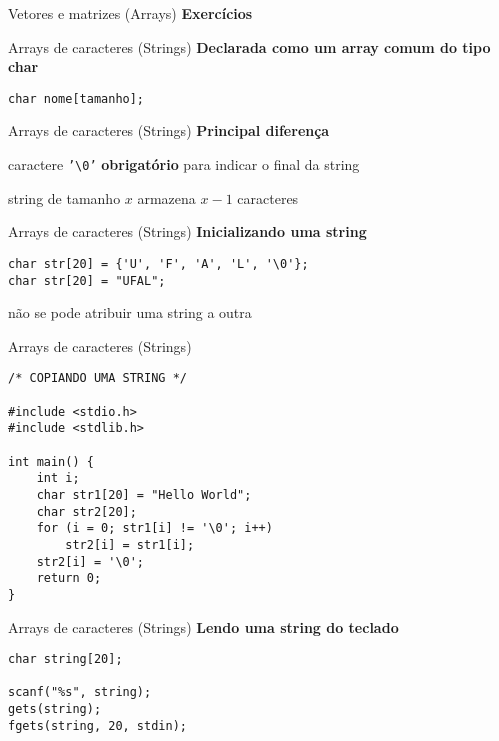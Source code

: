 \documentclass[10pt]{beamer}
\begin{document}
\begin{frame}{Vetores e matrizes (Arrays)}
    \huge \textbf{Exercícios}
\end{frame}

\begin{frame}[fragile]{Arrays de caracteres (Strings)}
    \huge
    \textbf{Declarada como um array comum do tipo char}

    \bigskip

    \begin{verbatim}
char nome[tamanho];
    \end{verbatim}
\end{frame}

\begin{frame}{Arrays de caracteres (Strings)}
    \huge
    \textbf{Principal diferença}

    \bigskip

    caractere \texttt{'\textbackslash 0'} \textbf{obrigatório} para indicar o final da string

    \vfill

    \Large
    string de tamanho $x$ armazena $x - 1$ caracteres
\end{frame}

\begin{frame}[fragile]{Arrays de caracteres (Strings)}
    \huge
    \textbf{Inicializando uma string}

    \bigskip

    \large
    \begin{verbatim}
char str[20] = {'U', 'F', 'A', 'L', '\0'};
char str[20] = "UFAL";
    \end{verbatim}

    \vfill

    \Large
    não se pode atribuir uma string a outra \faExclamationTriangle
\end{frame}

\begin{frame}[fragile]{Arrays de caracteres (Strings)}
    \begin{verbatim}
/* COPIANDO UMA STRING */

#include <stdio.h>
#include <stdlib.h>

int main() {
    int i;
    char str1[20] = "Hello World";
    char str2[20];
    for (i = 0; str1[i] != '\0'; i++)
        str2[i] = str1[i];
    str2[i] = '\0';
    return 0;
}
    \end{verbatim}
\end{frame}

\begin{frame}[fragile]{Arrays de caracteres (Strings)}
    \huge \textbf{Lendo uma string do teclado}

    \bigskip

    \Large
    \begin{verbatim}
char string[20];

scanf("%s", string);
gets(string);
fgets(string, 20, stdin);
    \end{verbatim}
\end{frame}
\end{document}
